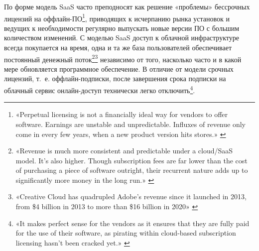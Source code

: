 \documentclass{article}
\begin{document}
По форме модель SaaS часто преподносят как решение «проблемы» бессрочных лицензий на оффлайн-ПО\footnote{«Perpetual licensing is not a financially ideal way for vendors to offer software. Earnings are unstable and unpredictable. Influxes of revenue only come in every few years, when a new product version hits stores.» \cite{saasVsPerpetualLicense}}, приводящих к исчерпанию рынка установок и ведущих к необходимости регулярно выпускать новые версии ПО с большим количеством изменений. С моделью SaaS доступ к облачной инфраструктуре всегда покупается на время, одна и та же база пользователей обеспечивает постоянный денежный поток\footnote{«Revenue is much more consistent and predictable under a cloud/SaaS model. It’s also higher. Though subscription fees are far lower than the cost of purchasing a piece of software outright, their recurrent nature adds up to significantly more money in the long run.» \cite{saasVsPerpetualLicense}}\footnote{«Creative Cloud has quadrupled Adobe's revenue since it launched in 2013, from \$4 billion in 2013 to more than \$16 billion in 2020» \cite{subscriptionProspere}} независимо от того, насколько часто и в какой мере обновляется программное обеспечение. В отличие от модели срочных лицензий, т.~е. оффлайн-подписки, после завершения срока подписки на облачный сервис онлайн-доступ технически легко отключить\footnote{«It makes perfect sense for the vendors as it ensures that they are fully paid for the use of their software, as pirating within cloud-based subscription licensing hasn’t been cracked yet.» \cite{microsoftMoveToSubscriptionAndSaas}}.
\end{document}
